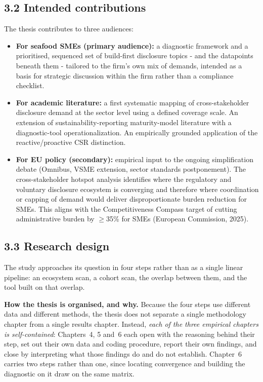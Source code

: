 \documentclass[
]{article}
\begin{document}
\subsection{3.2 Intended contributions}\label{intended-contributions}

The thesis contributes to three audiences:

\begin{itemize}
\item
  \textbf{For seafood SMEs (primary audience):} a diagnostic framework
  and a prioritised, sequenced set of build-first disclosure topics -   and the datapoints beneath them - tailored to the firm's own mix of
  demands, intended as a basis for strategic discussion within the firm
  rather than a compliance checklist.
\item
  \textbf{For academic literature:} a first systematic mapping of
  cross-stakeholder disclosure demand at the sector level using a
  defined coverage scale. An extension of sustainability-reporting
  maturity-model literature with a diagnostic-tool operationalization.
  An empirically grounded application of the reactive/proactive CSR
  distinction.
\item
  \textbf{For EU policy (secondary):} empirical input to the ongoing
  simplification debate (Omnibus, VSME extension, sector standards
  postponement). The cross-stakeholder hotspot analysis identifies where
  the regulatory and voluntary disclosure ecosystem is converging and
  therefore where coordination or capping of demand would deliver
  disproportionate burden reduction for SMEs. This aligns with the
  Competitiveness Compass target of cutting administrative burden by
  $\geq$35\% for SMEs (European Commission, 2025).
\end{itemize}

\subsection{3.3 Research design}\label{methodology}

The study approaches its question in four steps rather than as a single linear
pipeline: an ecosystem scan, a cohort scan, the overlap between them, and the
tool built on that overlap.

\textbf{How the thesis is organised, and why.} Because the four steps use
different data and different methods, the thesis does not separate a single
methodology chapter from a single results chapter. Instead, \emph{each of the
three empirical chapters is self-contained}: Chapters~4, 5 and~6 each open with
the reasoning behind their step, set out their own data and coding procedure,
report their own findings, and close by interpreting what those findings do and
do not establish. Chapter~6 carries two steps rather than one, since locating
convergence and building the diagnostic on it draw on the same matrix.
\end{document}
